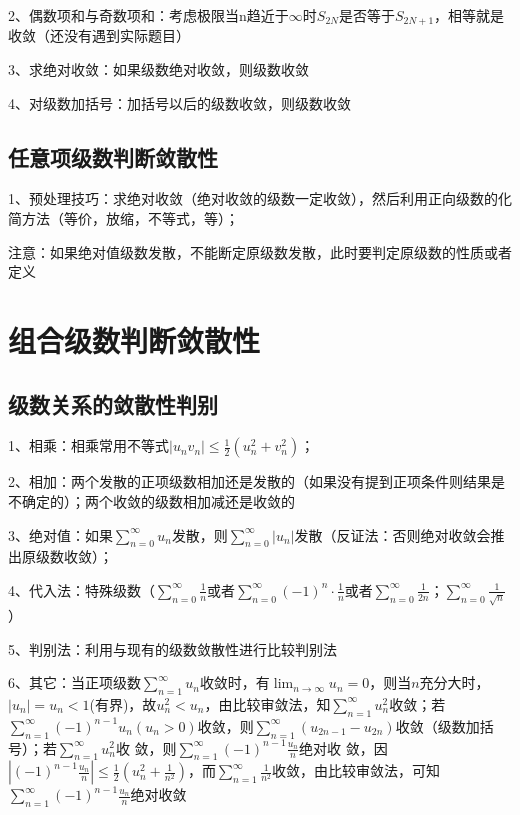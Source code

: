 2、偶数项和与奇数项和：考虑极限当n趋近于$\infty$时$S_{2N}$是否等于$S_{2N+1}$，相等就是收敛（还没有遇到实际题目）

3、求绝对收敛：如果级数绝对收敛，则级数收敛

4、对级数加括号：加括号以后的级数收敛，则级数收敛



\subsection{任意项级数判断敛散性}

1、预处理技巧：求绝对收敛（绝对收敛的级数一定收敛），然后利用正向级数的化简方法（等价，放缩，不等式，等）；

注意：如果绝对值级数发散，不能断定原级数发散，此时要判定原级数的性质或者定义

\section{组合级数判断敛散性}



\subsection{级数关系的敛散性判别}

1、相乘：相乘常用不等式$|u_nv_n| \le \frac{1}{2}(u_n^2+v_n^2)$；

2、相加：两个发散的正项级数相加还是发散的（如果没有提到正项条件则结果是不确定的）；两个收敛的级数相加减还是收敛的

3、绝对值：如果$\sum_{n=0}^{\infty}u_n$发散，则$\sum_{n=0}^{\infty}|u_n|$发散（反证法：否则绝对收敛会推出原级数收敛）；

4、代入法：特殊级数（$\sum_{n=0}^{\infty}\frac{1}{n}$或者$\sum_{n=0}^{\infty}(-1)^n·\frac{1}{n}$或者$\sum_{n=0}^{\infty}\frac{1}{2n}$；$\sum_{n=0}^{\infty}\frac{1}{\sqrt n}$）

5、判别法：利用与现有的级数敛散性进行比较判别法

6、其它：当正项级数$\sum_{n=1}^{\infty} u_{n}$收敛时，有$\lim_{n \rightarrow \infty} u_{n}=0$，则当$n$充分大时，$\left|u_{n}\right|=u_{n}<1$(有界)，故$u_{n}^{2}<u_{n}$，由比较审敛法，知$\sum_{n=1}^{\infty} u_{n}^{2}$收敛；若$\sum_{n=1}^{\infty}(-1)^{n-1} u_{n}\left(u_{n}>0\right)$收敛，则$\sum_{n=1}^{\infty}\left(u_{2 n-1}-u_{2 n}\right)$收敛（级数加括号）；若$\sum_{n=1}^{\infty} u_{n}^{2}$收 敛，则$\sum_{n=1}^{\infty}(-1)^{n-1} \frac{u_{n}}{n}$绝对收 敛，因$\left|(-1)^{n-1} \frac{u_{n}}{n}\right| \leqslant \frac{1}{2}\left(u_{n}^{2}+\frac{1}{n^{2}}\right)$，而$\sum_{n=1}^{\infty} \frac{1}{n^{2}}$收敛，由比较审敛法，可知$\sum_{n=1}^{\infty}(-1)^{n-1} \frac{u_{n}}{n}$绝对收敛



